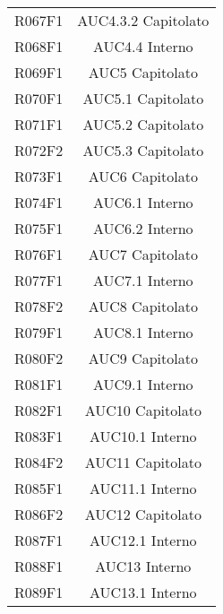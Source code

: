 \documentclass[../analisi-dei-requisiti.tex]{subfiles}
\begin{document}
\begin{longtable}[H]{c|c}
  R067F1                               & AUC4.3.2 Capitolato           \\
  R068F1                               & AUC4.4 Interno                \\
  R069F1                               & AUC5 Capitolato               \\
  R070F1                               & AUC5.1 Capitolato             \\
  R071F1                               & AUC5.2 Capitolato             \\
  R072F2                               & AUC5.3 Capitolato             \\
  R073F1                               & AUC6 Capitolato               \\
  R074F1                               & AUC6.1 Interno                \\
  R075F1                               & AUC6.2 Interno                \\
  R076F1                               & AUC7 Capitolato               \\
  R077F1                               & AUC7.1 Interno                \\
  R078F2                               & AUC8 Capitolato               \\
  R079F1                               & AUC8.1 Interno                \\
  R080F2                               & AUC9 Capitolato               \\
  R081F1                               & AUC9.1 Interno                \\
  R082F1                               & AUC10 Capitolato              \\
  R083F1                               & AUC10.1 Interno               \\
  R084F2                               & AUC11 Capitolato              \\
  R085F1                               & AUC11.1 Interno               \\
  R086F2                               & AUC12 Capitolato              \\
  R087F1                               & AUC12.1 Interno               \\
  R088F1                               & AUC13 Interno                 \\
  R089F1                               & AUC13.1 Interno               \\

\end{longtable}
\end{document}
